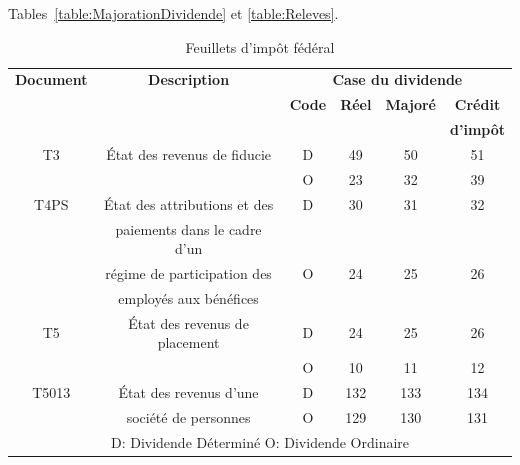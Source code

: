 Tables~\ref{table:MajorationDividende} et \ref{table:Releves}.
\begin{table}
	\centering
	\begin{tabular}{|c|c|c|c|c|c|}
		\hline
		\textbf{Document} &     \textbf{Description}      &          \multicolumn{4}{c|}{\textbf{Case du dividende}}           \\ \cline{3-6}
		                  &                               & \textbf{Code} & \textbf{Réel} & \textbf{Majoré} & \textbf{Crédit}  \\
		                  &                               &               &               &                 & \textbf{d'impôt} \\ \hline
		       T3         &  État des revenus de fiducie  &       D       &      49       &       50        &        51        \\ \cline{3-6}
		                  &                               &       O       &      23       &       32        &        39        \\ \hline
		      T4PS        & État des attributions et des  &       D       &      30       &       31        &        32        \\
		                  & paiements dans le cadre d'un  &               &               &                 &                  \\ \cline{3-6}
		                  &  régime de participation des  &       O       &      24       &       25        &        26        \\
		                  &    employés aux bénéfices     &               &               &                 &                  \\ \hline
		       T5         & État des revenus de placement &       D       &      24       &       25        &        26        \\ \cline{3-6}
		                  &                               &       O       &      10       &       11        &        12        \\ \hline
		      T5013       &    État des revenus d'une     &       D       &      132      &       133       &       134        \\ \cline{3-6}
		                  &     société de personnes      &       O       &      129      &       130       &       131        \\ \hline\hline
		\multicolumn{6}{|c|}{D: Dividende Déterminé \qquad O: Dividende Ordinaire}                                             \\ \hline
	\end{tabular}
	\caption{Feuillets d'impôt fédéral}
	\label{table:Feuillets}
\end{table}

